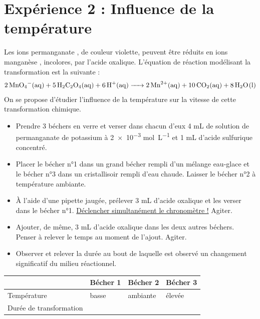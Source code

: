 \documentclass[a4paper,11pt,fleqn]{article}%
\begin{document}
\section*{Expérience 2 : Influence de la température}
Les ions permanganate , de couleur violette, peuvent être réduits en ions manganèse , incolores, par l'acide oxalique. L'équation de réaction modélisant la transformation est la suivante :
\begin{eqnarray}
    \ce{2MnO4-(aq) + 5H2C2O4(aq) + 6H+(aq) -> 2Mn^2+(aq) + 10CO2(aq) + 8H2O(l)} \nonumber
\end{eqnarray}
On se propose d'étudier l'influence de la température sur la vitesse de cette transformation chimique.
\begin{itemize}
    \item Prendre 3 béchers en verre et verser dans chacun d'eux 4 mL de solution de permanganate de potassium à \num{2e-3} \unit{\mole\per\liter} et \num{1} \unit{\milli\liter} d'acide sulfurique concentré.
    \item Placer le bécher n°1 dans un grand bécher rempli d'un mélange eau-glace et le bécher n°3 dans un cristallisoir rempli d'eau chaude. Laisser le bécher n°2 à température ambiante.
    \item À l'aide d'une pipette jaugée, prélever \num{3} \unit{\milli\liter} d'acide oxalique et les verser dans le bécher n°1. \underline{Déclencher simultanément le chronomètre !} Agiter.
    \item Ajouter, de même, \num{3} \unit{\milli\liter} d'acide oxalique dans les deux autres béchers. Penser à relever le temps au moment de l'ajout. Agiter.
    \item Observer et relever la durée au bout de laquelle est observé un changement significatif du milieu réactionnel.
\end{itemize}

\begin{table}[h!]
    \centering
    \begin{tabular}{|>{\centering}m{6cm}|>{\centering}m{2cm}|>{\centering}m{2cm}|>{\centering\arraybackslash}m{2cm}|}
    \hline & Bécher 1 & Bécher 2 & Bécher 3\\
    \hline Température & basse & ambiante & élevée\\
    \hline Durée de transformation & & & \rule[1cm]{0cm}{0cm} \\
    \hline
    \end{tabular}
    \label{tab:my_label}
\end{table}
\end{document}
